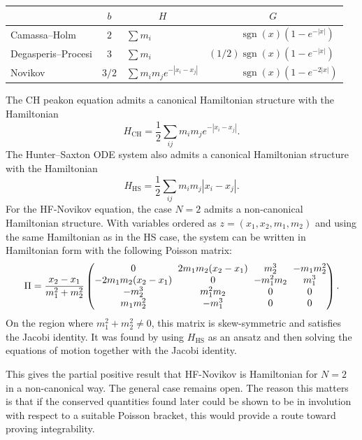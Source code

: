\documentclass[english,master]{liumaiex}
\theoremstyle{thesisplain}
\theoremstyle{thesisdefinition}
\DeclareMathOperator{\sgn}{sgn}
\numberwithin{equation}{section}
\begin{document}
\begin{center}
  \begin{tabular}{l|c|l|l}
    & $b$ & \multicolumn{1}{c|}{$H$} & \multicolumn{1}{c}{$G$} \\
    \hline
    Camassa--Holm
	& $2$ & $\sum m_i$ & $\phantom{(1/2)}\sgn(x)(1 - e^{-|x|})$ \\
    \hline
    Degasperis--Procesi
	& $3$ & $\sum m_i$ & $(1/2) \sgn(x)(1 - e^{-|x|})$ \\
    \hline
    Novikov
	& $3/2$ & $\sum m_i m_j e^{-|x_i - x_j|}$ & $\phantom{(1/2)}\sgn(x)(1 - e^{-2|x|})$ \\
  \end{tabular}
\end{center}
%
The CH peakon equation admits a canonical Hamiltonian structure with the Hamiltonian
\begin{equation}
	H_{\mathrm{CH}} = \frac{1}{2}\sum_{ij} m_i m_j e^{-|x_i-x_j|}.
\end{equation}
%
The Hunter--Saxton ODE system also admits a canonical Hamiltonian structure with the Hamiltonian \cite{Beals_2001}
\begin{equation}
	H_{\mathrm{HS}} = \frac{1}{2}\sum_{ij} m_i m_j |x_i-x_j|.
\end{equation}
%
For the HF-Novikov equation, the case $N=2$ admits a non-canonical Hamiltonian structure. With variables ordered as $z=(x_1,x_2,m_1,m_2)$ and using the same Hamiltonian as in the HS case, the system can be written in Hamiltonian form with the following Poisson matrix:
\begin{equation}
\Pi =
\frac{x_2-x_1}{m_1^2+m_2^2}
\begingroup
\setlength{\arraycolsep}{3pt}
\begin{pmatrix}
0 & 2m_1m_2(x_2-x_1) & m_2^3 & -m_1m_2^2 \\
-2m_1m_2(x_2-x_1) & 0 & -m_1^2m_2 & m_1^3 \\
-m_2^3 & m_1^2m_2 & 0 & 0 \\
m_1m_2^2 & -m_1^3 & 0 & 0
\end{pmatrix}
\endgroup.
\end{equation}
On the region where $m_1^2+m_2^2\neq0$, this matrix is skew-symmetric and satisfies the Jacobi identity. It was found by using $H_{\mathrm{HS}}$ as an ansatz and then solving the equations of motion together with the Jacobi identity.

This gives the partial positive result that HF-Novikov is Hamiltonian for $N=2$ in a non-canonical way. The general case remains open. The reason this matters is that if the conserved quantities found later could be shown to be in involution with respect to a suitable Poisson bracket, this would provide a route toward proving integrability.
\end{document}
